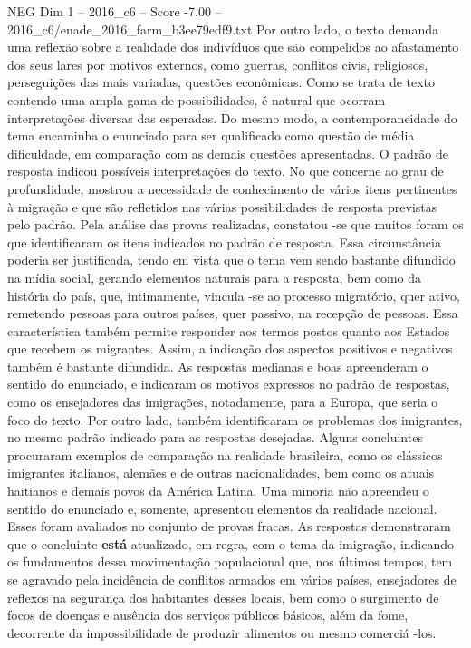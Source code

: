 \begin{textsample}{NEG Dim 1 – 2016\_c6 – Score -7.00 – 2016\_c6/enade\_2016\_farm\_b3ee79edf9.txt}
Por outro lado, o texto demanda uma reflexão sobre a realidade dos indivíduos que são compelidos ao afastamento dos seus lares por motivos externos, como guerras, conflitos civis, religiosos, perseguições das mais variadas, questões econômicas.
Como se trata de texto contendo uma ampla gama de possibilidades, é natural que ocorram interpretações diversas das esperadas.
Do mesmo modo, a contemporaneidade do tema encaminha o enunciado para ser qualificado como questão de média dificuldade, em comparação com as demais questões apresentadas.
O padrão de resposta indicou possíveis interpretações do texto.
No que concerne ao grau de profundidade, mostrou a necessidade de conhecimento de vários itens pertinentes à migração e que são refletidos nas várias possibilidades de resposta previstas pelo padrão.
Pela análise das provas realizadas, constatou -se que muitos foram os que identificaram os itens indicados no padrão de resposta.
Essa circunstância poderia ser justificada, tendo em vista que o tema vem sendo bastante difundido na mídia social, gerando elementos naturais para a resposta, bem como da história do país, que, intimamente, vincula -se ao processo migratório, quer ativo, remetendo pessoas para outros países, quer passivo, na recepção de pessoas.
Essa característica também permite responder aos termos postos quanto aos Estados que recebem os migrantes.
Assim, a indicação dos aspectos positivos e negativos também é bastante difundida.
As respostas medianas e boas apreenderam o sentido do enunciado, e indicaram os motivos expressos no padrão de respostas, como os ensejadores das imigrações, notadamente, para a Europa, que seria o foco do texto.
Por outro lado, também identificaram os problemas dos imigrantes, no mesmo padrão indicado para as respostas desejadas.
Alguns concluintes procuraram exemplos de comparação na realidade brasileira, como os clássicos imigrantes italianos, alemães e de outras nacionalidades, bem como os atuais haitianos e demais povos da América Latina.
Uma minoria não apreendeu o sentido do enunciado e, somente, apresentou elementos da realidade nacional.
Esses foram avaliados no conjunto de provas fracas.
As respostas demonstraram que o concluinte \textbf{está} atualizado, em regra, com o tema da imigração, indicando os fundamentos dessa movimentação populacional que, nos últimos tempos, tem se agravado pela incidência de conflitos armados em vários países, ensejadores de reflexos na segurança dos habitantes desses locais, bem como o surgimento de focos de doenças e ausência dos serviços públicos básicos, além da fome, decorrente da impossibilidade de produzir alimentos ou mesmo comerciá -los.

\end{textsample}
